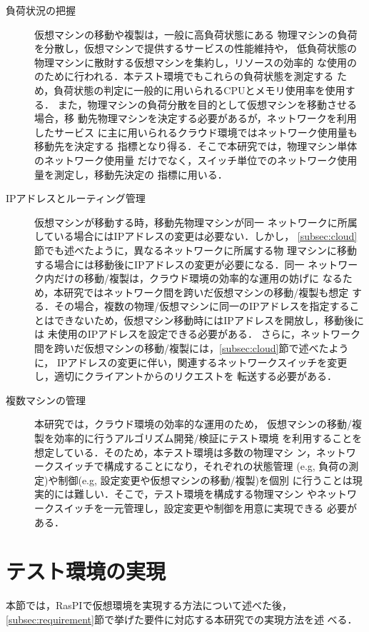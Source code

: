 \documentclass[submit,techrep]{ipsj}
\begin{document}
\begin{description}
\item [負荷状況の把握]仮想マシンの移動や複製は，一般に高負荷状態にある
  物理マシンの負荷を分散し，仮想マシンで提供するサービスの性能維持や，
  低負荷状態の物理マシンに散財する仮想マシンを集約し，リソースの効率的
  な使用ののために行われる．本テスト環境でもこれらの負荷状態を測定する
  ため，負荷状態の判定に一般的に用いられるCPUとメモリ使用率を使用する．
  また，物理マシンの負荷分散を目的として仮想マシンを移動させる場合，移
  動先物理マシンを決定する必要があるが，ネットワークを利用したサービス
  に主に用いられるクラウド環境ではネットワーク使用量も移動先を決定する
  指標となり得る．そこで本研究では，物理マシン単体のネットワーク使用量
  だけでなく，スイッチ単位でのネットワーク使用量を測定し，移動先決定の
  指標に用いる．

\item [IPアドレスとルーティング管理]仮想マシンが移動する時，移動先物理マシンが同一
  ネットワークに所属している場合にはIPアドレスの変更は必要ない．しかし，
  \ref{subsec:cloud}節でも述べたように，異なるネットワークに所属する物
  理マシンに移動する場合には移動後にIPアドレスの変更が必要になる．同一
  ネットワーク内だけの移動/複製は，クラウド環境の効率的な運用の妨げに
  なるため，本研究ではネットワーク間を跨いだ仮想マシンの移動/複製も想定
  する．その場合，複数の物理/仮想マシンに同一のIPアドレスを指定するこ
  とはできないため，仮想マシン移動時にはIPアドレスを開放し，移動後には
  未使用のIPアドレスを設定できる必要がある．
  さらに，ネットワーク間を跨いだ仮想マシンの移動/複製には，\ref{subsec:cloud}節で述べたように，
  IPアドレスの変更に伴い，関連するネットワークスイッチを変更し，適切にクライアントからのリクエストを
  転送する必要がある．

\item [複数マシンの管理]本研究では，クラウド環境の効率的な運用のため，
  仮想マシンの移動/複製を効率的に行うアルゴリズム開発/検証にテスト環境
  を利用することを想定している．そのため，本テスト環境は多数の物理マシ
  ン，ネットワークスイッチで構成することになり，それぞれの状態管理
  (e.g, 負荷の測定)や制御(e.g, 設定変更や仮想マシンの移動/複製)を個別
  に行うことは現実的には難しい．そこで，テスト環境を構成する物理マシン
  やネットワークスイッチを一元管理し，設定変更や制御を用意に実現できる
  必要がある．
  
\end{description}

\section{テスト環境の実現}
本節では，RasPIで仮想環境を実現する方法について述べた後，
\ref{subsec:requirement}節で挙げた要件に対応する本研究での実現方法を述
べる．
\end{document}
